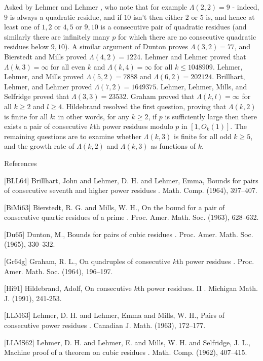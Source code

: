 \documentclass{article}
\begin{document}
Asked by Lehmer and Lehmer \cite{LeLe62}, who note that for example $\Lambda(2,2)=9$ - indeed, $9$ is always a quadratic residue, and if $10$ isn't then either $2$ or $5$ is, and hence at least one of $1,2$ or $4,5$ or $9,10$ is a consecutive pair of quadratic residues (and similarly there are infinitely many $p$ for which there are no consecutive quadratic residues below $9,10$). A similar argument of Dunton \cite{Du65} proves $\Lambda(3,2)=77$, and Bierstedt and Mills \cite{BiMi63} proved $\Lambda(4,2)=1224$. Lehmer and Lehmer proved that $\Lambda(k,3)=\infty$ for all even $k$ and $\Lambda(k,4)=\infty$ for all $k\leq 1048909$. Lehmer, Lehmer, and Mills \cite{LLM63} proved $\Lambda(5,2)=7888$ and $\Lambda(6,2)=202124$. Brillhart, Lehmer, and Lehmer \cite{BLL64} proved $\Lambda(7,2)=1649375$. Lehmer, Lehmer, Mills, and Selfridge \cite{LLMS62} proved that $\Lambda(3,3)=23532$. Graham \cite{Gr64g} proved that $\Lambda(k,l)=\infty$ for all $k\geq 2$ and $l\geq 4$. Hildebrand \cite{Hi91} resolved the first question, proving that $\Lambda(k,2)$ is finite for all $k$: in other words, for any $k\geq 2$, if $p$ is sufficiently large then there exists a pair of consecutive $k$th power residues modulo $p$ in $[1,O_k(1)]$. The remaining questions are to examine whether $\Lambda(k,3)$ is finite for all odd $k\geq 5$, and the growth rate of $\Lambda(k,2)$ and $\Lambda(k,3)$ as functions of $k$.




References

[BLL64] Brillhart, John and Lehmer, D. H. and Lehmer, Emma, Bounds for pairs of consecutive seventh and higher power residues . Math. Comp. (1964), 397--407.

[BiMi63] Bierstedt, R. G. and Mills, W. H., On the bound for a pair of consecutive quartic residues of a prime . Proc. Amer. Math. Soc. (1963), 628--632.

[Du65] Dunton, M., Bounds for pairs of cubic residues . Proc. Amer. Math. Soc. (1965), 330--332.

[Gr64g] Graham, R. L., On quadruples of consecutive {$k$}th power residues . Proc. Amer. Math. Soc. (1964), 196--197.

[Hi91] Hildebrand, Adolf, On consecutive {$k$}th power residues. II . Michigan Math. J. (1991), 241-253.

[LLM63] Lehmer, D. H. and Lehmer, Emma and Mills, W. H., Pairs of consecutive power residues . Canadian J. Math. (1963), 172--177.

[LLMS62] Lehmer, D. H. and Lehmer, E. and Mills, W. H. and Selfridge, J. L., Machine proof of a theorem on cubic residues . Math. Comp. (1962), 407--415.
\end{document}
